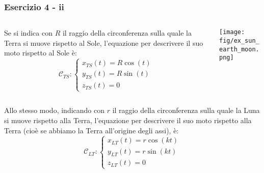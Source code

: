 \documentclass{beamer}
\newcommand{\fig}{figures} %
\begin{document}
\begin{frame}
	\frametitle{Esercizio 4 - ii}
	
	\begin{columns}
		\begin{column}{0.5\textwidth}
			Se si indica con $R$ il raggio della circonferenza sulla quale la Terra si muove rispetto al Sole, l'equazione per descrivere il suo moto rispetto al Sole \`e:
			\begin{displaymath}
			\mathcal{C}_{TS}:\begin{cases}
			x_{TS}(t)= R \cos(t)\\
			y_{TS}(t)= R \sin(t)\\
			z_{TS}(t)= 0
			\end{cases}
			\end{displaymath}
		\end{column}
		\begin{column}{0.5\textwidth}
			\texttt{[image: \\fig/ex\_sun\_earth\_moon.png]}
		\end{column}
	\end{columns}
\vspace{0.2cm}
    Allo stesso modo, indicando con $r$ il raggio della circonferenza sulla quale la Luna si muove rispetto alla Terra,  l'equazione per descrivere il suo moto rispetto alla Terra (cio\`e se abbiamo la Terra all'origine degli assi), \`e:
	\begin{displaymath}
	\mathcal{C}_{LT}:\begin{cases}
	x_{LT}(t)= r \cos(kt)\\
	y_{LT}(t)= r \sin(kt)\\
	z_{LT}(t)= 0
	\end{cases}
	\end{displaymath}
\end{frame}
\end{document}
